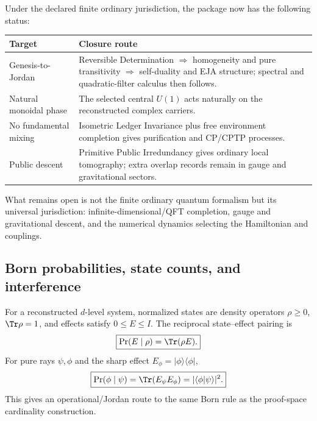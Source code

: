\begin{remark}
Under the declared finite ordinary jurisdiction, the package now has the following
status:
\begin{center}
\small
\begin{tabularx}{\textwidth}{l Y}
\toprule
Target & Closure route \\
\midrule
Genesis-to-Jordan
& Reversible Determination $\Rightarrow$ homogeneity and pure transitivity
$\Rightarrow$ self-duality and EJA structure; spectral and quadratic-filter calculus
then follows. \\
Natural monoidal phase
& The selected central $U(1)$ acts naturally on the reconstructed complex carriers. \\
No fundamental mixing
& Isometric Ledger Invariance plus free environment completion gives purification and
CP/CPTP processes. \\
Public descent
& Primitive Public Irredundancy gives ordinary local tomography; extra overlap records
remain in gauge and gravitational sectors. \\
\bottomrule
\end{tabularx}
\end{center}
What remains open is not the finite ordinary quantum formalism but its universal
jurisdiction: infinite-dimensional/QFT completion, gauge and gravitational descent,
and the numerical dynamics selecting the Hamiltonian and couplings.
\end{remark}

\subsection{Born probabilities, state counts, and interference}

\begin{corollary}
\label{cor:rd-born-trace}
For a reconstructed $d$-level system, normalized states are density operators
$\rho\ge0$, $\Tr\rho=1$, and effects satisfy $0\le E\le I$.  The reciprocal
state--effect pairing is
\[
 \boxed{\Pr(E\mid\rho)=\Tr(\rho E).}
\]
For pure rays $\psi,\phi$ and the sharp effect
$E_\phi=|\phi\rangle\!\langle\phi|$,
\[
 \boxed{
 \Pr(\phi\mid\psi)
 =
 \Tr(E_\psi E_\phi)
 =
 |\langle\phi|\psi\rangle|^2.
 }
\]
This gives an operational/Jordan route to the same Born rule as the proof-space
cardinality construction.
\end{corollary}

